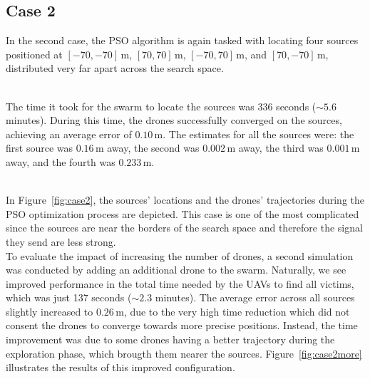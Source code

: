 \subsection{Case 2}
In the second case, the PSO algorithm is again tasked with locating four 
sources positioned at \([-70, -70] \, \text{m}\), \([70, 70] \, \text{m}\), \([-70, 70] \, \text{m}\), and \([70, -70] \, \text{m}\), 
distributed very far apart across the search space.

\noindent\\
The time it took for the swarm to locate the sources was 336 seconds (\(\sim 5.6\) minutes). 
During this time, 
the drones successfully converged on the sources, achieving an average error of \(0.10 \, \text{m}\). 
The estimates for all the sources were: the first source was \(0.16 \, \text{m}\) away, 
the second was \(0.002 \, \text{m}\) away, the third was \(0.001 \, \text{m}\) away, 
and the fourth was \(0.233 \, \text{m}\). 

\noindent\\
In Figure~\ref{fig:case2}, the sources' locations and the drones' 
trajectories during the PSO optimization process are depicted. 
This case is one of the most complicated since the sources are near
the borders of the search space and therefore
the signal they send are less strong.
\noindent\\
To evaluate the impact of increasing the number of drones, a second simulation 
was conducted by adding an additional drone to the swarm. 
Naturally, we see improved performance in the total time
needed by the UAVs to find all victims, which was just 137 seconds (\(\sim 2.3\) minutes).
The average error across all sources slightly increased to \(0.26 \, \text{m}\),
due to the very high time reduction which did not consent the drones
to converge towards more precise positions. 
Instead, the time improvement was due to some drones 
having a better trajectory during the exploration phase, which brougth 
them nearer the sources.
Figure~\ref{fig:case2more} illustrates the results of this improved configuration. 

